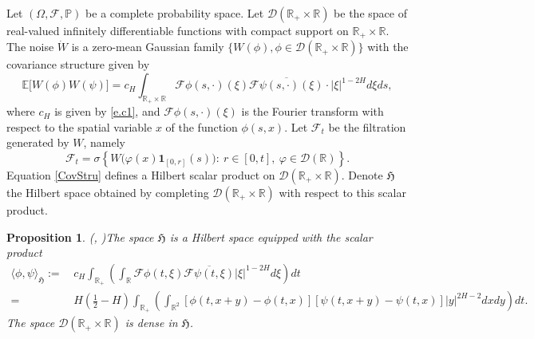 \documentclass[11pt,reqno]{amsart}
\numberwithin{equation}{section}
\newtheorem{proposition}[theorem]{Proposition}
\newcommand{\1}{{\bf 1}}
\newcommand{\2}{{\bf 2}}
\begin{document}
 Let   $(\Omega,\mathcal{F},\mathbb{P})$ be a complete probability space.  Let
    $\mathcal{D}(\mathbb{R}_{+}\times \mathbb{R})$  be  the space of real-valued infinitely differentiable functions with compact support on $\mathbb{R}_{+}\times \mathbb{R}$.
The noise $\dot W$ is  a zero-mean Gaussian family $\{W(\phi), \phi\in\mathcal{D}(\mathbb{R}_{+}\times \mathbb{R})\}$  with the covariance structure given by
 \begin{equation}\label{CovStru}
   \mathbb{E}\big[ W(\phi)W(\psi)\big]=c_{H}\int_{\mathbb{R}_{+}\times \mathbb{R}} \mathscr {F} \phi(s, \cdot)(\xi) \overline{ \mathscr {F}\psi(s, \cdot)(\xi)}\cdot |\xi|^{1-2H}d\xi ds,
 \end{equation}
 where  $c_{H}$ is given by   \eqref{e.c1},   and $ \mathscr {F}\phi(s, \cdot)(\xi)$ is the Fourier transform with respect to the spatial variable $x$ of the function $\phi(s,x)$.
 Let $\mathcal F_t$ be the filtration generated by $W$, namely
 $$
 \mathcal F_t=\sigma\left\{ W\big(\varphi(x) {\mathbf 1}_{[0,r]}(s)\big):\ r\in [0, t], \ \varphi\in \mathcal D(\mathbb R) \right\}.
 $$
  Equation \eqref{CovStru}  defines   a Hilbert scalar product on $\mathcal{D}(\mathbb{R}_{+}\times \mathbb{R}) $.
Denote $\mathfrak{H}$ the Hilbert space obtained by completing $\mathcal{D}(\mathbb{R}_{+}\times \mathbb{R}) $ with respect to this scalar  product.
\begin{proposition}  (\cite[Proposition 2.1, Equation (2.8)]{HHLNT2017}, \cite[Theorem 3.1]{PT2000})\label{hSpaceProp}
 The  space $\mathfrak{H}$ is a Hilbert space equipped with the scalar  product
\begin{equation*}
\begin{split}
     \langle\phi,\psi\rangle_{\mathfrak{H}}
     :=&\,c_{H}\int_{\mathbb{R}_{+}}\left(\int_ {\mathbb{R}} \mathscr {F} \phi(t,\xi) \overline{ \mathscr {F}\psi(t,\xi)}  |\xi|^{1-2H}d\xi \right)dt
     \\
     =&\, H\left(\frac12-H\right) \int_{\mathbb{R}_+}\left(\int_{\mathbb{R}^2}[\phi(t, x+y)-\phi(t, x)] [\psi(t, x+y)-\psi(t, x)] |y|^{2H-2} dxdy\right)dt.
   \end{split}
   \end{equation*}
 The space  $\mathcal{D}(\mathbb{R}_{+}\times \mathbb{R})$ is dense in $\mathfrak{H}$.
 \end{proposition}
\end{document}
